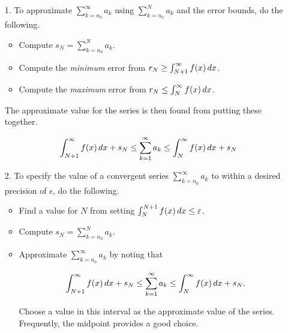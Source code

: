 \documentclass{ximera}
\begin{document}
\begin{itemize}
\item[1.] To approximate $\sum_{k=n_0}^{\infty} a_k$ using $\sum_{k=n_0}^{N} a_k$ and the error bounds, do the following.

\begin{itemize}
\item Compute $s_N=\sum_{k=n_0}^{N} a_k$.
\item Compute the \emph{minimum} error from $r_N \geq \int_{N+1}^\infty f(x) \,d x $.
\item Compute the \emph{maximum} error from $r_N \leq \int_{N}^\infty f(x) \,d x $.
\end{itemize}

The approximate value for the series is then found from putting these together.

\[
\int_{N+1}^\infty f(x) \,d x  +s_N \leq \sum_{k=1}^{\infty} a_k \leq \int_{N}^\infty f(x) \,d x  +s_N
\]

\item[2.] To specify the value of a convergent series $\sum_{k=n_0}^{\infty} a_k$ to within a desired precision of $\epsilon$, do the following.

\begin{itemize}
\item Find a value for $N$ from setting $\int_N^{N+1} f(x) \,d x \leq \varepsilon$.  
\item Compute $s_N=\sum_{k=n_0}^{N} a_k$.
\item Approximate $\sum_{k=n_0}^{\infty} a_k$ by noting that 

\[
\int_{N+1}^\infty f(x) \,d x  +s_N \leq \sum_{k=1}^{\infty} a_k \leq \int_{N}^\infty f(x) \,d x  +s_N.
\]

Choose a value in this interval as the approximate value of the series.  Frequently, the midpoint provides a good choice.
\end{itemize}


\end{itemize}
\end{document}
